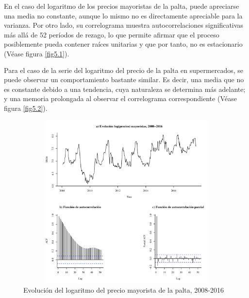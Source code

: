 \documentclass[12pt, twoside]{book}\usepackage[]{graphicx}\usepackage[]{color}
\newenvironment{knitrout}{}{} %
\numberwithin{equation}{section}
\numberwithin{theorem}{section}
\numberwithin{teorema}{section}
\numberwithin{defi}{section}
\numberwithin{prop}{section}
\numberwithin{defi}{section}
\theoremstyle{plain}
\begin{document}
En el caso del logaritmo de los precios mayoristas de la palta, puede apreciarse una media no constante, aunque lo mismo no es directamente apreciable  para la varianza. Por otro lado, su correlograma muestra autocorrelaciones significativas más allá de 52 períodos de rezago, lo que permite afirmar que el proceso posiblemente pueda contener raíces unitarias y que por tanto, no es estacionario (Véase figura \ref{fig5.1}).

Para el caso de la serie del logaritmo del precio de la palta en supermercados, se puede observar un comportamiento bastante similar. Es decir, una media que no es constante debido a una tendencia, cuya naturaleza se determina más adelante; y una memoria prolongada al observar el correlograma correspondiente (Véase figura \ref{fig5.2}).  


\begin{knitrout}
\color{fgcolor}\begin{figure}[!htpb]

{\centering \includegraphics[width=4.5in,height=3.5in]{figure/fig-2_1-1} 

}

\caption{Evolución del logaritmo del precio mayorista de la palta, 2008-2016\label{fig5.1}}\label{fig:fig-2.1}
\end{figure}


\end{knitrout}
\end{document}
